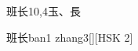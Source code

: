 \begin{entry}{班长}{10,4}{⽟、⾧}
  \begin{phonetics}{班长}{ban1 zhang3}[][HSK 2]
  \end{phonetics}
\end{entry}
